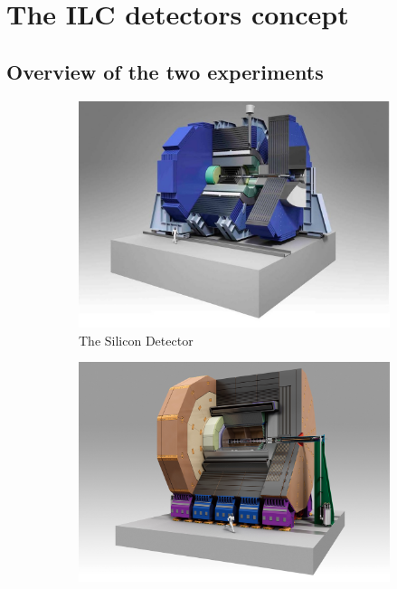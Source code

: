 
  \section{The ILC detectors concept}
  \label{sec:detectors}

    \subsection{Overview of the two experiments}
    
    \begin{figure}[!h]
      \centering
      \begin{subfigure}[t]{0.5\textwidth}
        \includegraphics[width = \textwidth]{Pictures/ILC/SiD.jpg}
        \caption{\label{fig:SiD} The Silicon Detector}
      \end{subfigure}
      \begin{subfigure}[t]{0.5\textwidth}
        \includegraphics[width = 1.03\textwidth]{Pictures/ILC/ILD.jpg}

\end{subfigure}
\end{figure}
